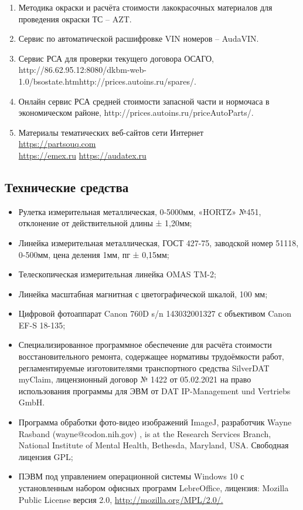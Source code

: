\begin{enumerate}
\item  Методика окраски и расчёта стоимости лакокрасочных материалов для проведения окраски ТС – AZT. 
\item  Сервис по автоматической расшифровке VIN номеров – AudaVIN.
\item  Сервис РСА для проверки текущего договора ОСАГО,  http://86.62.95.12:8080/dkbm-web-1.0/bsostate.htmhttp://prices.autoins.ru/spares/.
\item  Онлайн сервис РСА средней стоимости запасной части и нормочаса в экономическом районе,    http://prices.autoins.ru/priceAutoParts/.
\item  	Материалы тематических веб-сайтов сети Интернет\\
\url{https://partsouq.com}\\
\url{https://emex.ru}
\url{https://audatex.ru}
\end{enumerate}


\subsection{Технические средства}

\begin{itemize}
\item  Рулетка измерительная металлическая, 0-5000мм, «HORTZ» №451, отклонение от действительной длины ± 1,20мм;
\item  Линейка измерительная металлическая, ГОСТ 427-75, заводской номер 51118, 0-500мм, цена деления 1мм, пг ± 0,15мм;
\item Телескопическая измерительная линейка OMAS TM-2;
\item  Линейка масштабная магнитная с цветографической шкалой, 100 мм;
\item  Цифровой фотоаппарат  Canon 760D s/n 143032001327  с объективом Canon EF-S 18-135;
\item  Специализированное программное обеспечение для расчёта стоимости  восстановительного ремонта, содержащее нормативы трудоёмкости работ, регламентируемые изготовителями транспортного средства  SilverDAT myClaim,
лицензионный договор № 1422 от 05.02.2021 на право использования программы для ЭВМ от  DAT IP-Management und Vertriebs GmbH.
\item  Программа обработки фото-видео изображений ImageJ, разработчик  Wayne Rasband (wayne@codon.nih.gov) , is at the Research Services Branch, National Institute of Mental Health, Bethesda, Maryland, USA. Свободная лицензия GPL;
\item  ПЭВМ под управлением операционной системы Windows 10 с установленным набором офисных программ LebreOffice, лицензия: Mozilla Public License версия 2.0, \url{http://mozilla.org/MPL/2.0/.}
\end{itemize}
